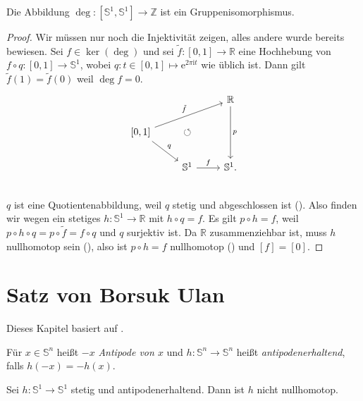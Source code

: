 \documentclass[
12pt, 
openany, 
a4paper, 
final,
fleqn, 
]{myclass}
\numberwithin{equation}{chapter}
\numberwithin{section}{chapter}
\newcommand{\ZZ}{\mathbb Z}
\newcommand{\RR}{\mathbb R}
\newcommand{\Ss}{\mathbb S}
\newcommand{\todo}[1]{}
\renewcommand{\cite}[2][]{}
\begin{document}
\begin{thr}\label{5.12}
Die Abbildung $ \deg: [\mathbb{S}^{1}, \mathbb{S}^{1}]\to \ZZ$ ist ein Gruppenisomorphismus.
\end{thr}
\begin{proof}
Wir müssen nur noch die Injektivität zeigen, alles andere wurde bereits bewiesen. Sei $ f\in \ker(\deg) $ und sei $ \tilde f: [0, 1]\to\RR $ eine Hochhebung von $ f\circ q : [0, 1]\to \mathbb{S}^{1} $, wobei $ q:t\in [0,1]\mapsto \mathrm{e}^{2\pi\mathrm{i}t} $ wie üblich ist. Dann gilt $ \tilde f(1) = \tilde f(0) $ weil $ \deg f = 0 $. 
\[
\begin{tikzcd}
& & \RR \arrow{dd}{p}\\
\text{$ [0,1] $}\arrow{urr}{\tilde f}\arrow{dr}{q}&  \circlearrowleft& \\
& \Ss^1 \arrow{r}{f} & \Ss^1.\\
\end{tikzcd}
\]
$ q $ ist eine Quotientenabbildung, weil $ q $ stetig und abgeschlossen ist (). Also finden wir wegen  ein stetiges $ h: \mathbb{S}^{1}\to \mathbb{R}$ mit $ h\circ q = f $. Es gilt $ p\circ h = f $, weil $ p \circ h \circ q = p\circ \tilde f = f\circ q $ und $ q $ surjektiv ist. Da $ \RR $ zusammenziehbar ist, muss $ h $ nullhomotop sein (), also ist $ p\circ h = f $ nullhomotop () und $ [f] = [0] $. 
\end{proof}

\chapter{Satz von Borsuk Ulan}
Dieses Kapitel basiert auf \cite{munkres_topology_2021} \todo{Section 5.7}.
\todo{Diagramm mit Motivation}

\begin{defn}\label{6.1}
Für $ x\in \mathbb{S}^{n} $ heißt $ -x $ \emph{Antipode von $ x $} und $ h: \mathbb{S}^{n}\to \mathbb{S}^{n} $ heißt \emph{antipodenerhaltend}, falls $ h(-x) = -h(x) $.  
\end{defn}

\begin{thr}\label{6.2}
Sei $ h: \mathbb{S}^{1}\to \mathbb{S}^{1} $ stetig und antipodenerhaltend. Dann ist $ h $ nicht nullhomotop.
\end{thr}
\end{document}
